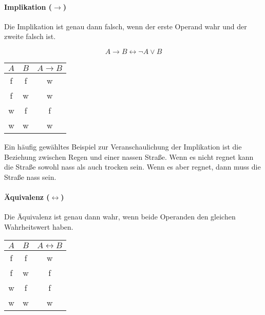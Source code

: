 \documentclass[../main.tex]{subfiles}
\begin{document}
        \paragraph{Implikation ($\rightarrow$)}
            Die Implikation ist genau dann falsch, wenn der erste Operand wahr und der zweite falsch ist.
            
            \begin{equation}
                A \rightarrow B \leftrightarrow \neg A \vee B
            \end{equation}
            
            \begin{center}
                \begin{tabular}{ | c | c | c | }
                    \hline
                    $A$ & $B$  & $A \rightarrow B$ \\\hline
                    f & f & w \\
                    f & w & w \\
                    w & f & f \\
                    w & w & w \\\hline
                \end{tabular}
            \end{center}
            
            Ein häufig gewähltes Beispiel zur Veranschaulichung der Implikation ist die Beziehung zwischen Regen und einer nassen Straße. Wenn es nicht regnet kann die Straße sowohl nass als auch trocken sein. Wenn es aber regnet, dann muss die Straße nass sein.
            
        \paragraph{Äquivalenz ($\leftrightarrow$)}
            Die Äquivalenz ist genau dann wahr, wenn beide Operanden den gleichen Wahrheitswert haben.
            
            \begin{center}
                \begin{tabular}{ | c | c | c | }
                    \hline
                    $A$ & $B$  & $A \leftrightarrow B$ \\\hline
                    f & f & w \\
                    f & w & f \\
                    w & f & f \\
                    w & w & w \\\hline
                \end{tabular}
            \end{center}
                
\end{document}

